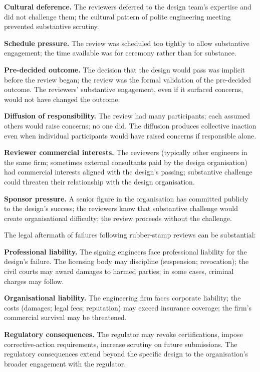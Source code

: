 \textbf{Cultural deference.} The reviewers deferred to the design team's expertise and did not challenge them; the cultural pattern of polite engineering meeting prevented substantive scrutiny.

\textbf{Schedule pressure.} The review was scheduled too tightly to allow substantive engagement; the time available was for ceremony rather than for substance.

\textbf{Pre-decided outcome.} The decision that the design would pass was implicit before the review began; the review was the formal validation of the pre-decided outcome. The reviewers' substantive engagement, even if it surfaced concerns, would not have changed the outcome.

\textbf{Diffusion of responsibility.} The review had many participants; each assumed others would raise concerns; no one did. The diffusion produces collective inaction even when individual participants would have raised concerns if responsible alone.

\textbf{Reviewer commercial interests.} The reviewers (typically other engineers in the same firm; sometimes external consultants paid by the design organisation) had commercial interests aligned with the design's passing; substantive challenge could threaten their relationship with the design organisation.

\textbf{Sponsor pressure.} A senior figure in the organisation has committed publicly to the design's success; the reviewers know that substantive challenge would create organisational difficulty; the review proceeds without the challenge.

The legal aftermath of failures following rubber-stamp reviews can be substantial:

\textbf{Professional liability.} The signing engineers face professional liability for the design's failure. The licensing body may discipline (suspension; revocation); the civil courts may award damages to harmed parties; in some cases, criminal charges may follow.

\textbf{Organisational liability.} The engineering firm faces corporate liability; the costs (damages; legal fees; reputation) may exceed insurance coverage; the firm's commercial survival may be threatened.

\textbf{Regulatory consequences.} The regulator may revoke certifications, impose corrective-action requirements, increase scrutiny on future submissions. The regulatory consequences extend beyond the specific design to the organisation's broader engagement with the regulator.

